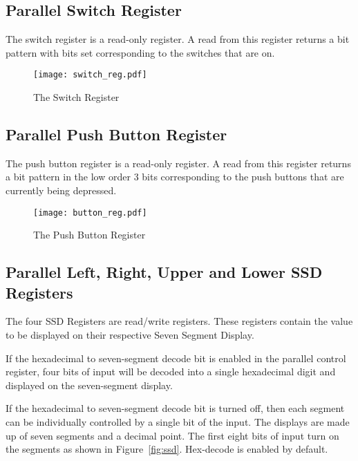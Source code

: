 \subsection{Parallel Switch Register}

The switch register is a read-only register. A read from this register
returns a bit pattern with bits set corresponding to the switches that
are on.

\begin{figure}[h]
\begin{center}
\texttt{[image: switch\_reg.pdf]}
\caption{The Switch Register}
\label{switch_reg_pic}
\end{center}
\end{figure}


\subsection{Parallel Push Button Register}

The push button register is a read-only register. A read from this
register returns a bit pattern in the low order 3 bits corresponding
to the push buttons that are currently being depressed.

\begin{figure}[h]
\begin{center}
\texttt{[image: button\_reg.pdf]}
\caption{The Push Button Register}
\label{button_reg_pic}
\end{center}
\end{figure}

\subsection{Parallel Left, Right, Upper and Lower SSD Registers}

The four SSD Registers are read/write registers. These
registers contain the value to be displayed on their respective Seven
Segment Display. 

If the hexadecimal to seven-segment decode bit is enabled in the
parallel control register, four bits of input will be decoded into a
single hexadecimal digit and displayed on the seven-segment display.

If the hexadecimal to seven-segment decode bit is turned off, then
each segment can be individually controlled by a single bit of the
input. The displays are made up of seven segments and a decimal point.
The first eight bits of input turn on the segments as shown in
Figure~\ref{fig:ssd}.
Hex-decode is enabled by default.

